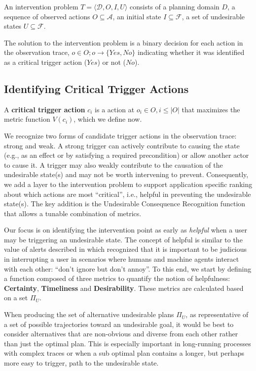 \begin{definition}
An intervention problem $T = \langle \mathcal{D}, O, I, U \rangle$ consists of a planning domain $D$, a sequence of observed actions  $O \subseteq \mathcal{A}$, an initial state $I \subseteq \mathcal{F}$, a set of undesirable states $U\subseteq \mathcal{F}$.
\end{definition}
The solution to the intervention problem is a binary decision for each action in the observation trace, $o \in O;  o \rightarrow \lbrace Yes, No \rbrace$ indicating whether it was identified as a critical trigger action ($Yes$) or not ($No$).


\subsection{Identifying Critical Trigger Actions}
A \textbf{critical trigger action} $c_i$ is a  action at $o_i \in O, i\leq |O|$ that maximizes the metric function $V (c_i)$, which we define now.

We recognize two forms of candidate trigger actions in the observation trace: strong and weak. 
A strong trigger can actively contribute to causing the state (e.g., as an effect or by satisfying a required precondition) or allow another actor to cause it. 
A trigger may also weakly contribute to the causation of the undesirable state(s) and may not be worth intervening to prevent. 
Consequently, we add a layer to the intervention problem to support application specific ranking about which actions are most ``critical'', i.e., helpful in preventing the undesirable state(s). 
The key addition is the Undesirable Consequence Recognition function that allows a tunable combination of metrics.

Our focus is on identifying the intervention point as early as  \textit{helpful} when a user may be triggering an undesirable state. 
The concept of helpful is similar to the value of alerts described in \cite{Wilkins2003} which recognized that it is important to be judicious in interrupting a user in scenarios where humans and machine agents interact with each other: ``don't ignore but don't annoy''. 
To this end, we start by defining a function composed of three  metrics to quantify the notion of helpfulness: \textbf{Certainty}, \textbf{Timeliness} and \textbf{Desirability}. 
These metrics are calculated based on a set $\Pi_U$.


When producing the set of alternative undesirable plans $\Pi_U$, as representative of a set of possible trajectories toward an undesirable goal, it would be best to consider alternatives that are non-obvious and diverse from each other rather than just the optimal plan.  
This is especially important in long-running processes with complex traces or when a sub optimal plan contains a longer, but perhaps more easy to trigger, path to the undesirable state.

